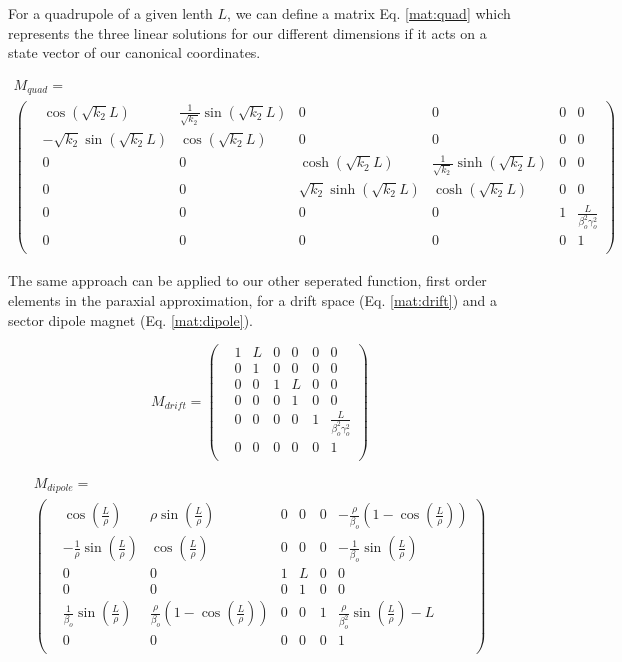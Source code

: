 For a quadrupole of a given lenth $L$, we can define a matrix Eq. \ref{mat:quad} which represents the three linear solutions for our different dimensions if it acts on a state vector of our canonical coordinates.

\begin{multline} \label{mat:quad}
	M_{quad} = \\
\begin{pmatrix} 
	&\cos{\left(\sqrt{k_2} L\right)} &\frac{1}{\sqrt{k_2}}\sin{\left(\sqrt{k_2} L\right)} &0 &0 &0 &0\\
	&-\sqrt{k_2}\sin{\left(\sqrt{k_2} L\right)} &\cos{\left(\sqrt{k_2} L\right)} &0 &0 &0 &0\\
	&0 &0 &\cosh{\left(\sqrt{k_2} L\right)} &\frac{1}{\sqrt{k_2}}\sinh{\left(\sqrt{k_2} L\right)} &0 &0\\
	&0 &0 &\sqrt{k_2}\sinh{\left(\sqrt{k_2} L\right)} &\cosh{\left(\sqrt{k_2} L\right)} &0 &0\\
	&0 &0 &0 &0 &1 &\frac{L}{\beta_o^2\gamma_o^2}\\
	&0 &0 &0 &0 &0 &1\\
\end{pmatrix}
\end{multline}

The same approach can be applied to our other seperated function, first order elements in the paraxial approximation, for a drift space (Eq. \ref{mat:drift}) and a sector dipole magnet (Eq. \ref{mat:dipole}).

\begin{equation} \label{mat:drift}
	M_{drift} =
\begin{pmatrix}
	&1 &L &0 &0 &0 &0\\
	&0 &1 &0 &0 &0 &0\\
	&0 &0 &1 &L &0 &0\\
	&0 &0 &0 &1 &0 &0\\
	&0 &0 &0 &0 &1 &\frac{L}{\beta_o^2\gamma_o^2}\\
	&0 &0 &0 &0 &0 &1\\
\end{pmatrix}
\end{equation}

\begin{multline} \label{mat:dipole}
	M_{dipole} = \\
\begin{pmatrix}
	&\cos{\left(\frac{L}{\rho}\right)} &\rho \sin{\left(\frac{L}{\rho}\right)} &0 &0 &0 &-\frac{\rho}{\beta_o}\left(1 - \cos{\left(\frac{L}{\rho}\right)}\right)\\
	&-\frac{1}{\rho}\sin{\left(\frac{L}{\rho}\right)} &\cos{\left(\frac{L}{\rho}\right)} &0 &0 &0 &-\frac{1}{\beta_o}\sin{\left(\frac{L}{\rho}\right)}\\
	&0 &0 &1 &L &0 &0\\
	&0 &0 &0 &1 &0 &0\\
	&\frac{1}{\beta_o}\sin{\left(\frac{L}{\rho}\right)} &\frac{\rho}{\beta_o}\left(1 - \cos{\left(\frac{L}{\rho}\right)}\right) &0 &0 &1 &\frac{\rho}{\beta_o^2}\sin{\left(\frac{L}{\rho}\right)} - L\\
	&0 &0 &0 &0 &0 &1\\
\end{pmatrix}
\end{multline}

